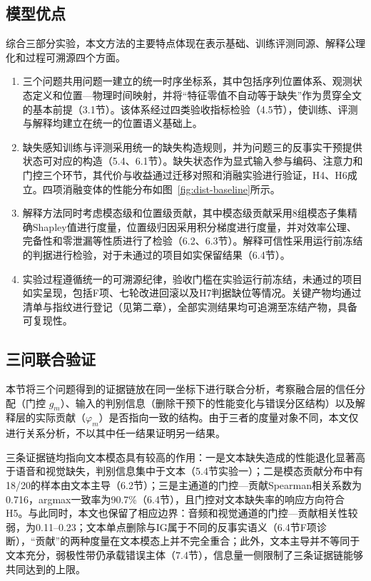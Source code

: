 \documentclass[colorprint,nocoverzero]{gmcmthesis}
\begin{document}
\subsection{模型优点}\label{subsec:q7-pros}
综合三部分实验，本文方法的主要特点体现在表示基础、训练评测同源、解释公理化和过程可溯源四个方面。
\begin{enumerate}
    \item 三个问题共用问题一建立的统一时序坐标系，其中包括序列位置体系、观测状态定义和位置—物理时间映射，并将“特征零值不自动等于缺失”作为贯穿全文的基本前提（3.1节）。该体系经过四类验收指标检验（4.5节），使训练、评测与解释均建立在统一的位置语义基础上。

    \item 缺失感知训练与评测采用统一的缺失构造规则，并为问题三的反事实干预提供状态可对应的构造（5.4、6.1节）。缺失状态作为显式输入参与编码、注意力和门控三个环节，其代价与收益通过迁移对照和消融实验进行验证，H4、H6成立。四项消融变体的性能分布如图~\ref{fig:dist-baseline}所示。

    \item 解释方法同时考虑模态级和位置级贡献，其中模态级贡献采用8组模态子集精确Shapley值进行度量，位置级归因采用积分梯度进行度量，并对效率公理、完备性和零泄漏等性质进行了检验（6.2、6.3节）。解释可信性采用运行前冻结的判据进行检验，对于未通过的项目如实保留结果（6.4节）。

    \item 实验过程遵循统一的可溯源纪律，验收门槛在实验运行前冻结，未通过的项目如实呈现，包括F项、七轮改进回滚以及H7判据缺位等情况。关键产物均通过清单与指纹进行登记（见第二章），全部实测结果均可追溯至冻结产物，具备可复现性。
\end{enumerate}

\subsection{三问联合验证}\label{subsec:q7-joint}
本节将三个问题得到的证据链放在同一坐标下进行联合分析，考察融合层的信任分配（门控 $g_m$）、输入的判别信息（删除干预下的性能变化与错误分区结构）以及解释层的实际贡献（$\varphi_m$）是否指向一致的结构。由于三者的度量对象不同，本文仅进行关系分析，不以其中任一结果证明另一结果。

三条证据链均指向文本模态具有较高的作用：一是文本缺失造成的性能退化显著高于语音和视觉缺失，判别信息集中于文本（5.4节实验一）；二是模态贡献分布中有18/20的样本由文本主导（6.2节）；三是主通道的门控—贡献Spearman相关系数为0.716，argmax一致率为90.7\%（6.4节），且门控对文本缺失率的响应方向符合H5。与此同时，本文也保留了相应边界：音频和视觉通道的门控—贡献相关性较弱，为0.11–0.23；文本单点删除与IG属于不同的反事实语义（6.4节F项诊断），“贡献”的两种度量在文本模态上并不完全重合；此外，文本主导并不等同于文本充分，弱极性带仍承载错误主体（7.4节），信息量一侧限制了三条证据链能够共同达到的上限。
\end{document}
